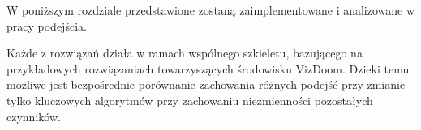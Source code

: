 W poniższym rozdziale przedstawione zostaną zaimplementowane i analizowane w pracy podejścia.

Każde z rozwiązań działa w ramach wspólnego szkieletu, bazującego na przykładowych rozwiązaniach towarzyszących środowisku VizDoom. Dzieki temu możliwe jest bezpośrednie porównanie zachowania różnych podejść przy zmianie tylko kluczowych algorytmów przy zachowaniu niezmienności pozostałych czynników.
